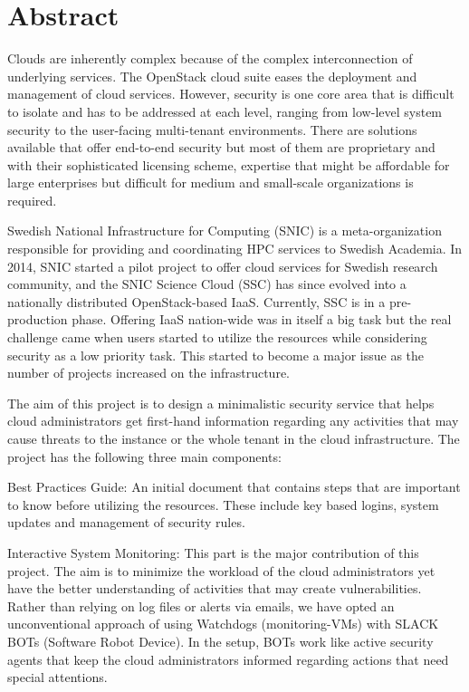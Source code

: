\documentclass[12pt]{article}
\begin{document}

\newpage
\tableofcontents
\newpage

\section{Abstract}
Clouds are inherently complex because of the complex interconnection of underlying services. The OpenStack cloud suite eases the deployment and management of cloud services. However, security is one core area that is difficult to isolate and has to be addressed at each level, ranging from low-level system security to the user-facing multi-tenant environments. There are solutions available that offer end-to-end security but most of them are proprietary and with their sophisticated licensing scheme, expertise that might be affordable for large enterprises but difficult for medium and small-scale organizations is required.

Swedish National Infrastructure for Computing (SNIC) is a meta-organization responsible for providing and coordinating HPC services to Swedish Academia. In 2014, SNIC started a pilot project to offer cloud services for Swedish research community, and the SNIC Science Cloud (SSC) has since evolved into a nationally distributed OpenStack-based IaaS. Currently, SSC is in a pre-production phase. Offering IaaS nation-wide was in itself a big task but the real challenge came when users started to utilize the resources while considering security as a low priority task. This started to become a major issue as the number of projects increased on the infrastructure.

The aim of this project is to design a minimalistic security service that helps cloud administrators get first-hand information regarding any activities that may cause threats to the instance or the whole tenant in the cloud infrastructure. The project has the following three main components:

Best Practices Guide: An initial document that contains steps that are important to know before utilizing the resources. These include key based logins, system updates and management of security rules.

Interactive System Monitoring: This part is the major contribution of this project. The aim is to minimize the workload of the cloud administrators yet have the better understanding of activities that may create vulnerabilities. Rather than relying on log files or alerts via emails, we have opted an unconventional approach of using Watchdogs (monitoring-VMs) with SLACK BOTs (Software Robot Device). In the setup, BOTs work like active security agents that keep the cloud administrators informed regarding actions that need special attentions.
\end{document}
